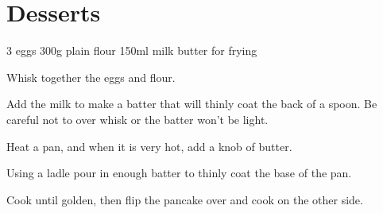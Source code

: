 \chapter{Desserts}
\minitoc

\label{desserts:crepes}
\begin{ingreds}
    3 eggs
    300g plain flour
    150ml milk
    butter for frying
\end{ingreds}

\begin{method}
    Whisk together the eggs and flour.

    Add the milk to make a batter that will thinly coat the
    back of a spoon.  Be careful not to over whisk or the batter
    won't be light.

    Heat a pan, and when it is very hot, add a knob of butter.

    Using a ladle pour in enough batter to thinly coat the base of
    the pan.

    Cook until golden, then flip the pancake over and cook on the
    other side.

\end{method}


\begin{ingreds}
	
\end{ingreds}